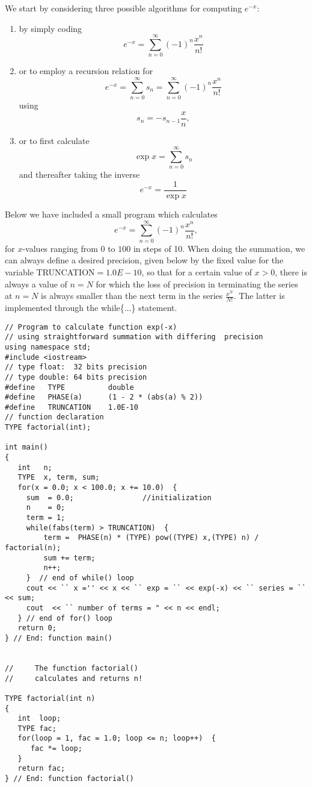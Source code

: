 We start by considering three possible algorithms
for computing $e^{-x}$:
\begin{enumerate}
\item by simply coding \[e^{-x}=\sum_{n=0}^{\infty}(-1)^n\frac{x^n}{n!}\]
\item or to employ a recursion relation for
\[
e^{-x}=\sum_{n=0}^{\infty}s_n=\sum_{n=0}^{\infty}(-1)^n\frac{x^n}{n!}
\]
using 
\[
s_n=-s_{n-1}\frac{x}{n},
\]
\item or to first calculate  
\[ 
\exp{x}=\sum_{n=0}^{\infty}s_n
\]
and thereafter taking the inverse 
\[
   e^{-x}=\frac{1}{\exp{x}}
\]
%
\end{enumerate}
Below we have included a small program which calculates 
\[
e^{-x}=\sum_{n=0}^{\infty}(-1)^n\frac{x^n}{n!},
\]
for $x$-values ranging from $0$ to $100$ in steps of 10. 
When doing the summation, we can always define a desired precision,
given below by the fixed value for the 
variable TRUNCATION$=1.0E-10$, so that for 
a certain value of $x>0$, there is always a value of $n=N$ 
for which the loss of precision in terminating the series at $n=N$ 
is always smaller than the next term in the series $\frac{x^{N}}{N!}$.
The latter is implemented through the while\{$\dots$\} 
statement.
\lstset{language=c++}
\begin{lstlisting}[title={\url{http://folk.uio.no/mhjensen/compphys/programs/chapter02/cpp/program4.cpp}}]
// Program to calculate function exp(-x)
// using straightforward summation with differing  precision
using namespace std;
#include <iostream>
// type float:  32 bits precision
// type double: 64 bits precision
#define   TYPE          double
#define   PHASE(a)      (1 - 2 * (abs(a) % 2))
#define   TRUNCATION    1.0E-10
// function declaration 
TYPE factorial(int);

int main()
{
   int   n;
   TYPE  x, term, sum;
   for(x = 0.0; x < 100.0; x += 10.0)  {
     sum  = 0.0;                //initialization
     n    = 0;
     term = 1;
     while(fabs(term) > TRUNCATION)  {
         term =  PHASE(n) * (TYPE) pow((TYPE) x,(TYPE) n) / factorial(n);
         sum += term;
         n++;
     }  // end of while() loop 
     cout << `` x ='' << x << `` exp = `` << exp(-x) << `` series = `` << sum;
     cout  << `` number of terms = " << n << endl;
   } // end of for() loop 
   return 0;
} // End: function main() 


//     The function factorial()
//     calculates and returns n!
 
TYPE factorial(int n)
{
   int  loop;
   TYPE fac;
   for(loop = 1, fac = 1.0; loop <= n; loop++)  {
      fac *= loop;
   }
   return fac;
} // End: function factorial()
\end{lstlisting}
